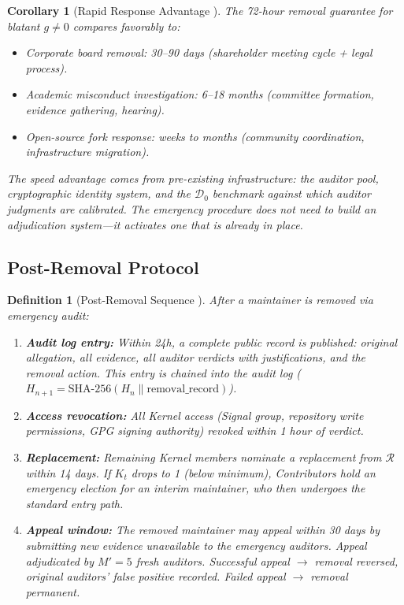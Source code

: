 \documentclass[12pt,a4paper]{article}
\newtheorem{corollary}[theorem]{Corollary}
\newtheorem{definition}[theorem]{Definition}
\theoremstyle{definition}
\newcommand{\RotationPool}{\mathcal{R}}
\newcommand{\gnonzero}{g \neq 0}
\newcommand{\GzeroDecl}{\mathcal{D}_{0}}
\begin{document}
\begin{corollary}[Rapid Response Advantage ]
\label{cor:rapid_response}
The 72-hour removal guarantee for blatant $\gnonzero$ compares favorably to:
\begin{itemize}
    \item Corporate board removal: 30--90 days (shareholder meeting cycle + legal process).
    \item Academic misconduct investigation: 6--18 months (committee formation, evidence gathering, hearing).
    \item Open-source fork response: weeks to months (community coordination, infrastructure migration).
\end{itemize}
The speed advantage comes from pre-existing infrastructure: the auditor pool, cryptographic identity system, and the $\GzeroDecl$ benchmark against which auditor judgments are calibrated. The emergency procedure does not need to \textit{build} an adjudication system---it activates one that is already in place.
\end{corollary}
\subsection{Post-Removal Protocol}
\begin{definition}[Post-Removal Sequence ]
\label{def:post_removal}
After a maintainer is removed via emergency audit:
\begin{enumerate}[label=(\roman*)]
    \item \textbf{Audit log entry:} Within 24h, a complete public record is published: original allegation, all evidence, all auditor verdicts with justifications, and the removal action. This entry is chained into the audit log ($H_{n+1} = \text{SHA-256}(H_n \| \text{removal\_record})$).
    \item \textbf{Access revocation:} All Kernel access (Signal group, repository write permissions, GPG signing authority) revoked within 1 hour of verdict.
    \item \textbf{Replacement:} Remaining Kernel members nominate a replacement from $\RotationPool$ within 14 days. If $K_t$ drops to 1 (below minimum), Contributors hold an emergency election for an interim maintainer, who then undergoes the standard entry path.
    \item \textbf{Appeal window:} The removed maintainer may appeal within 30 days by submitting new evidence unavailable to the emergency auditors. Appeal adjudicated by $M'=5$ fresh auditors. Successful appeal $\to$ removal reversed, original auditors' false positive recorded. Failed appeal $\to$ removal permanent.
\end{enumerate}
\end{definition}
\end{document}
